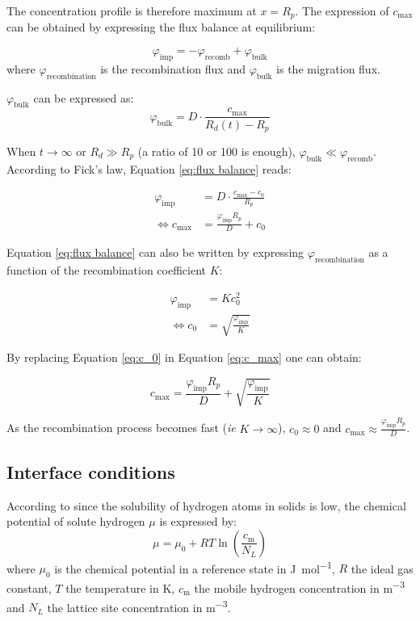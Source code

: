 The concentration profile is therefore maximum at $x=R_p$.
The expression of $c_\mathrm{max}$ can be obtained by expressing the flux balance at equilibrium:

\begin{equation}
    \varphi_\mathrm{imp} = -\varphi_\mathrm{recomb} + \varphi_\mathrm{bulk}
    \label{eq:flux balance}
\end{equation}
where $\varphi_\mathrm{recombination}$ is the recombination flux and $\varphi_\mathrm{bulk}$ is the migration flux.

$\varphi_\mathrm{bulk}$ can be expressed as:
\begin{equation}
    \varphi_\mathrm{bulk} = D \cdot \frac{c_\mathrm{max}}{R_d(t) - R_p}
\end{equation}

When $t \rightarrow \infty$ or $R_d \gg R_p$ (a ratio of 10 or 100 is enough), $\varphi_\mathrm{bulk} \ll \varphi_\mathrm{recomb}$.
According to Fick's law, Equation \ref{eq:flux balance} reads:

\begin{eqnarray}
    \varphi_\mathrm{imp} &= D \cdot \frac{c_\mathrm{max}-c_{0}}{R_{p}} \\
    \Leftrightarrow c_\mathrm{max} &= \frac{\varphi_\mathrm{imp} R_{p}}{D}+ c_0
    \label{eq:c_max}
\end{eqnarray}

Equation \ref{eq:flux balance} can also be written by expressing $\varphi_\mathrm{recombination}$ as a function of the recombination coefficient $K$:

\begin{eqnarray}
    \varphi_\mathrm{imp} &= K c_{0}^{2} \\
    \Leftrightarrow c_{0} &= \sqrt{\frac{\varphi_\mathrm{imp}}{K}}
    \label{eq:c_0}
\end{eqnarray}

By replacing Equation \ref{eq:c_0} in Equation \ref{eq:c_max} one can obtain:

\begin{equation}
    c_\mathrm{max} = \frac{\varphi_\mathrm{imp} R_{p}}{D}+\sqrt{\frac{\varphi_\mathrm{imp}}{K}}
\end{equation}

As the recombination process becomes fast (\textit{ie} $K \rightarrow \infty$), $c_0 \approx 0$ and $c_\mathrm{max} \approx \frac{\varphi_\mathrm{imp} R_{p}}{D}$.


\subsection{Interface conditions}
According to  since the solubility of hydrogen atoms in solids is low, the chemical potential of solute hydrogen $\mu$ is expressed by:
\begin{equation}
    \mu = \mu_0 + RT \ln\left( \frac{c_\mathrm{m}}{N_L}\right)
\end{equation}
where $\mu_0$ is the chemical potential in a reference state in \si{J.mol^{-1}}, $R$ the ideal gas constant, $T$ the temperature in \si{K}, $c_\mathrm{m}$ the mobile hydrogen concentration in \si{m^{-3}} and $N_L$ the lattice site concentration in \si{m^{-3}}.

